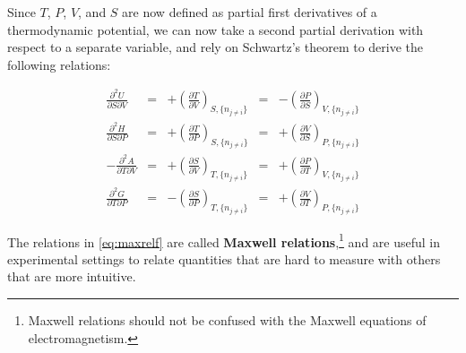 \documentclass[
  9pt,
]{extbook}
\theoremstyle{definition}
\theoremstyle{definition}
\theoremstyle{definition}
\theoremstyle{remark}
\begin{document}
Since \(T\), \(P\), \(V\), and \(S\) are now defined as partial first derivatives of a thermodynamic potential, we can now take a second partial derivation with respect to a separate variable, and rely on Schwartz's theorem to derive the following relations:

\begin{equation}
\begin{aligned}
\frac{\partial^2 U }{\partial S \partial V} &=& +\left(\frac{\partial T}{\partial V}\right)_{S,\{n_{j \neq i}\}} &=& -\left(\frac{\partial P}{\partial S}\right)_{V,\{n_{j \neq i}\}}   \\
\frac{\partial^2 H }{\partial S \partial P} &=& +\left(\frac{\partial T}{\partial P}\right)_{S,\{n_{j \neq i}\}} &=& +\left(\frac{\partial V}{\partial S}\right)_{P,\{n_{j \neq i}\}}  \\
-\frac{\partial^2 A }{\partial T \partial V} &=& +\left(\frac{\partial S}{\partial V}\right)_{T,\{n_{j \neq i}\}} &=& +\left(\frac{\partial P}{\partial T}\right)_{V,\{n_{j \neq i}\}}  \\
\frac{\partial^2 G }{\partial T \partial P} &=& -\left(\frac{\partial S}{\partial P}\right)_{T,\{n_{j \neq i}\}} &=& +\left(\frac{\partial V}{\partial T}\right)_{P,\{n_{j \neq i}\}}
\end{aligned}
\label{eq:maxrelf}
\end{equation}

The relations in \eqref{eq:maxrelf} are called \textbf{Maxwell relations},\footnote{Maxwell relations should not be confused with the Maxwell equations of electromagnetism.} and are useful in experimental settings to relate quantities that are hard to measure with others that are more intuitive.
\end{document}
